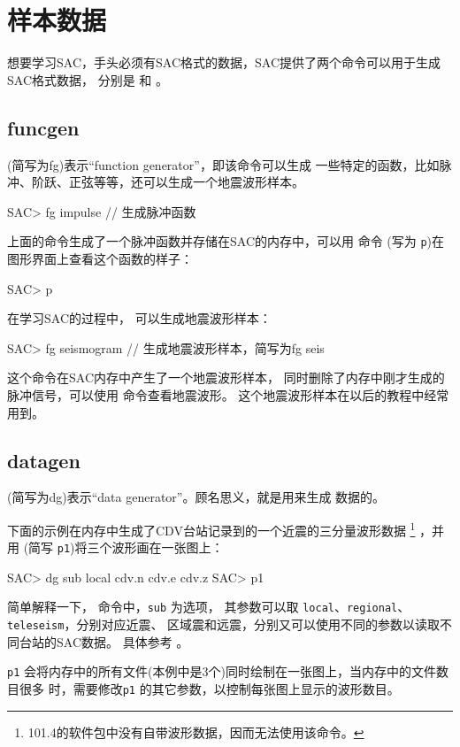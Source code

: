 \section{样本数据}
想要学习SAC，手头必须有SAC格式的数据，SAC提供了两个命令可以用于生成SAC格式数据，
分别是  和 。

\subsection{funcgen}
(简写为fg)表示``function generator''，即该命令可以生成
一些特定的函数，比如脉冲、阶跃、正弦等等，还可以生成一个地震波形样本。
\begin{SACCode}
SAC> fg impulse         // 生成脉冲函数
\end{SACCode}
上面的命令生成了一个脉冲函数并存储在SAC的内存中，可以用
命令  (写为 \texttt{p})在图形界面上查看这个函数的样子：
\begin{SACCode}
SAC> p
\end{SACCode}

在学习SAC的过程中， 可以生成地震波形样本：
\begin{SACCode}
SAC> fg seismogram      // 生成地震波形样本，简写为fg seis
\end{SACCode}
这个命令在SAC内存中产生了一个地震波形样本，
同时删除了内存中刚才生成的脉冲信号，可以使用  命令查看地震波形。
这个地震波形样本在以后的教程中经常用到。

\subsection{datagen}
(简写为dg)表示``data generator''。顾名思义，就是用来生成
数据的。

下面的示例在内存中生成了CDV台站记录到的一个近震的三分量波形数据
\footnote{101.4的软件包中没有自带波形数据，因而无法使用该命令。}
，并用  (简写 \texttt{p1})将三个波形画在一张图上：
\begin{SACCode}
SAC> dg sub local cdv.n cdv.e cdv.z
SAC> p1
\end{SACCode}
简单解释一下， 命令中，\texttt{sub} 为选项，
其参数可以取 \texttt{local}、\texttt{regional}、\texttt{teleseism}，分别对应近震、
区域震和远震，分别又可以使用不同的参数以读取不同台站的SAC数据。
具体参考 。

\texttt{p1} 会将内存中的所有文件(本例中是3个)同时绘制在一张图上，当内存中的文件数目很多
时，需要修改\texttt{p1} 的其它参数，以控制每张图上显示的波形数目。